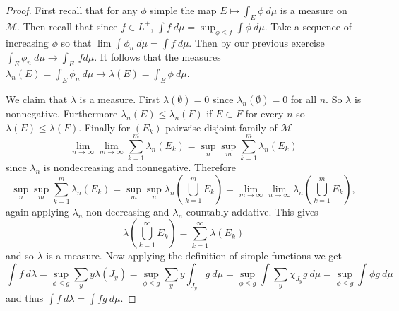 \documentclass[11pt]{amsart}
\theoremstyle{definition}
\numberwithin{theorem}{section}
\numberwithin{definition}{section}
\numberwithin{equation}{section}
\def\scriptm{{\mathcal M}}
\begin{document}
\begin{proof}
  First recall that for any $\phi$ simple the map $E \mapsto \int_E \phi\ d\mu$ is a measure on $\scriptm.$ Then recall that since $f \in L^+$, $\int f\ d\mu = \sup_{\phi \leq f} \int \phi\ d\mu.$ Take a sequence of increasing $\phi$ so that $\lim \int \phi_n\ d\mu = \int f\ d\mu.$ Then by our previous exercise $\int_E \phi_n\ d\mu \to \int_E\ fd\mu$. It follows that the measures $\lambda_n(E) = \int_E \phi_n\ d\mu \to \lambda(E) = \int_E \phi\ d\mu$.

  We claim that $\lambda$ is a measure. First $\lambda(\emptyset) = 0$ since $\lambda_n(\emptyset) = 0$ for all $n$. So $\lambda$ is nonnegative. Furthermore $\lambda_n(E) \leq \lambda_n(F)$ if $E \subset F$ for every $n$ so $\lambda(E) \leq \lambda(F)$. Finally for $(E_k)$ pairwise disjoint family of $\scriptm$
  \begin{equation*}
     \lim_{n\to\infty} \lim_{m \to \infty} \sum_{k=1}^m \lambda_n\left(E_k\right) = \sup_{n}\sup_m \sum_{k=1}^m \lambda_n\left(E_k\right)
  \end{equation*}
  since $\lambda_n$ is nondecreasing and nonnegative. Therefore $$\sup_{n}\sup_m \sum_{k=1}^m \lambda_n\left(E_k\right) = \sup_{m}\sup_n \lambda_n\left(\bigcup_{k=1}^m E_k\right)  = \lim_{m\to\infty} \lim_{n \to \infty} \lambda_n\left(\bigcup_{k=1}^m E_k\right),$$ 
  again applying $\lambda_n$ non decreasing and $\lambda_n$ countably addative. This gives
  \begin{equation*}
      \lambda\left(\bigcup_{k=1}^\infty E_k\right) = \sum_{k=1}^\infty \lambda\left(E_k\right)
  \end{equation*}
  and so $\lambda$ is a measure. Now applying the definition of simple functions we get \begin{equation*}
    \int f\ d\lambda = \sup_{\phi \leq g} \sum_y y \lambda({J_y}) = \sup_{\phi \leq g} \sum_y y \int_{J_y} g\  d\mu = \sup_{\phi\leq g} \int \sum_y\chi_{J_y}g\ d\mu = \sup_{\phi \leq g} \int \phi g\ d\mu
  \end{equation*}
  and thus $\int f\ d\lambda = \int fg\ d\mu.$

\end{proof}
\end{document}
